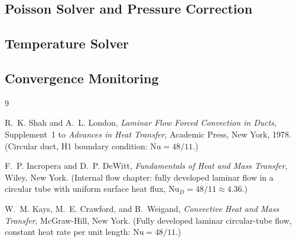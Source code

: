 \documentclass[12pt,a4paper]{article}
\begin{document}
\subsection{Poisson Solver and Pressure Correction}





\subsection{Temperature Solver}


\subsection{Convergence Monitoring}



\newpage

\begin{thebibliography}{9}

R.~K. Shah and A.~L. London,
\emph{Laminar Flow Forced Convection in Ducts},
Supplement~1 to \emph{Advances in Heat Transfer}, Academic Press, New York, 1978.
(Circular duct, H1 boundary condition: $\text{Nu} = 48/11$.)

F.~P. Incropera and D.~P. DeWitt,
\emph{Fundamentals of Heat and Mass Transfer},
Wiley, New York.
(Internal flow chapter: fully developed laminar flow in a circular tube with uniform surface
heat flux, $\text{Nu}_D = 48/11 \approx 4.36$.)

W.~M. Kays, M.~E. Crawford, and B.~Weigand,
\emph{Convective Heat and Mass Transfer},
McGraw-Hill, New York.
(Fully developed laminar circular-tube flow, constant heat rate per unit length:
$\text{Nu} = 48/11$.)

\end{thebibliography}
\end{document}
